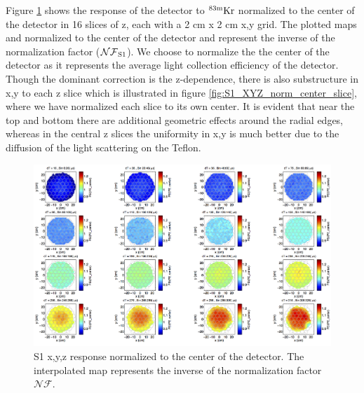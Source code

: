 Figure \ref{fig:S1_XYZ_norm_center} shows the response of the detector to $\rm^{83m}Kr$ normalized to the center of the detector in 16 slices of z, each with a 2 cm x 2 cm x,y grid. The plotted maps and normalized to the center of the detector and represent the inverse of the normalization factor ($\rm \mathcal{NF}_{S1}$). We choose to normalize the the center of the detector as it represents the average light collection efficiency of the detector. Though the dominant correction is the z-dependence, there is also substructure in x,y to each z slice which is illustrated in figure \ref{fig:S1_XYZ_norm_center_slice}, where we have normalized each slice to its own center. It is evident that near the top and bottom there are additional geometric effects around the radial edges, whereas in the central z slices the uniformity in x,y is much better due to the diffusion of the light scattering on the Teflon.

\renewcommand{\baselinestretch}{1}
\small\normalsize
\begin{figure}\centering
\includegraphics[width=230mm]{Chapter_XYZ_Corr/Thesis_Corr_Plots/S1_XYZ_Kr_norm_center_crop_80.png}
\caption{S1 x,y,z response normalized to the center of the detector. The interpolated map represents the inverse of the normalization factor $\mathcal{NF}$. }
\label{fig:S1_XYZ_norm_center}
\end{figure}
\renewcommand{\baselinestretch}{2}
\small\normalsize

